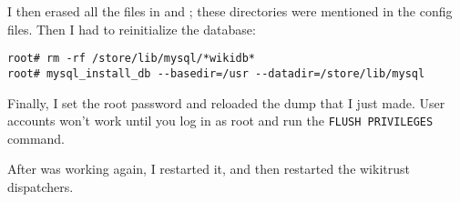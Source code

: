 I then erased all the \mysql files in  and
; these directories were mentioned in
the config files.
Then I had to reinitialize the database:
\begin{verbatim}
root# rm -rf /store/lib/mysql/*wikidb*
root# mysql_install_db --basedir=/usr --datadir=/store/lib/mysql
\end{verbatim}

Finally, I set the root password and reloaded the dump that I just made.
User accounts won't work until you log in as root and run
the \texttt{FLUSH PRIVILEGES} command.

After \mysql was working again, I restarted it, and then
restarted the wikitrust dispatchers.

